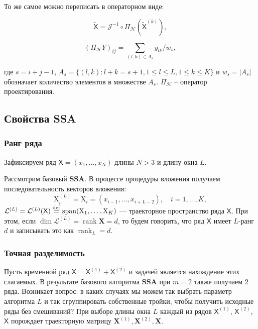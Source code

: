\documentclass[a4paper, 11pt]{article}
\newcommand{\SSA}{\textbf{SSA}}
\newcommand{\TS}{\mathsf{X}}
\begin{document}
То же самое можно переписать в операторном виде:

\begin{equation*}
	\widetilde{\TS} = \mathcal{J}^{-1} \circ \Pi_{\mathcal{H}}(\widetilde{\TS}^{(k)}),
\end{equation*}

\begin{equation}
	\label{eq:ssa_projector}
	(\Pi_{\mathcal{H}}Y)_{ij} = \sum_{(l,k) \in A_s} y_{lk}/w_s,
\end{equation}

где \( s = i + j - 1 \), \( A_s = \{(l,k) : l + k = s + 1, 1 \leq l \leq L, 1 \leq k \leq K\} \) и \( w_s = |A_s| \) обозначает количество элементов в множестве \( A_s \). $\Pi_{\mathcal{H}}$ -- оператор проектирования.


\subsection{Свойства SSA}


\subsubsection{Ранг ряда}
\label{subsubsec: ssa_rank}
Зафиксируем ряд $\TS = (x_1, \dots, x_{N})$ длины $N > 3$ и длину окна $L$.

Рассмотрим базовый $\SSA$. В процессе процедуры вложения получаем последовательность векторов вложения:
\begin{equation*}
	\mathrm{X}_i^{(L)} = \mathrm{X}_i = (x_{i-1}, \dots, x_{i+L-2}), \quad i = 1, \dots, K,
\end{equation*}
$\mathcal{L}^{(L)} = \mathcal{L}^{(L)}(\TS) \stackrel{{\rm def}}{{=}} \operatorname{span}(\mathrm X_{1}, \ldots, \mathrm X_{K})$ --- траекторное пространство ряда $\TS$.
При этом, если $\dim \mathcal{L}^{(L)}= \operatorname{rank} \mathbf X = d$, то будем говорить, что ряд $\TS$ имеет $L$-ранг $d$ и записывать это как $\operatorname{rank}_L = d$.

\subsubsection{Точная разделимость}


Пусть временной ряд  $\TS = \TS^{(1)} + \TS^{(2)}$ и задачей является нахождение этих слагаемых. В результате базового алгоритма $\SSA$ при $m = 2$ также получаем $2$ ряда. Возникает вопрос: в каких случаях мы можем так выбрать параметр алгоритма $L$ и так сгруппировать собственные тройки, чтобы получить исходные ряды без смешиваний?
При выборе длины окна $L$ каждый из рядов $\TS^{(1)}$, $\TS^{(2)}$, $\TS$ порождает траекторную матрицу $\mathbf{X}^{(1)}, \mathbf{X}^{(2)}, \mathbf{X}$.
\end{document}
